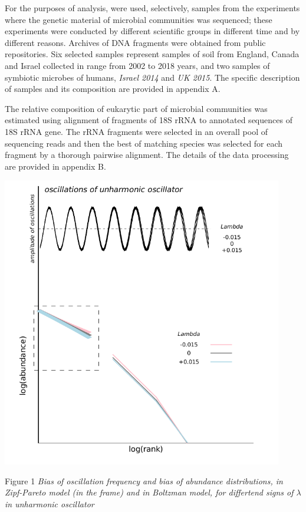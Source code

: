 \documentclass[a4paper]{article}
\begin{document}
For the purposes of analysis, were used, selectively, samples from the experiments where the genetic material of microbial communities was sequenced; these experiments were conducted by different scientific groups in different time and by different reasons. Archives of DNA fragments were obtained from public repositories. Six selected samples represent samples of soil from England, Canada and Israel collected in range from 2002 to 2018 years, and two samples of symbiotic microbes of humans, \textit{Israel 2014} and \textit{UK 2015}. The specific description of samples and its composition are provided in appendix A.

The relative composition of eukarytic part of microbial communities was estimated using alignment of fragments of 18S rRNA to annotated sequences of 18S rRNA gene. The rRNA fragments were selected in an overall pool of sequencing reads and then the best of matching species was selected for each fragment by a thorough pairwise alignment. The details of the data processing are provided in appendix B.


\includegraphics[width=0.92\textwidth]{rankabundance_unharmonic.jpg}

Figure 1 \textit{Bias of oscillation frequency and bias of abundance distributions, in Zipf-Pareto model (in the frame) and in Boltzman model, for differtend signs of $\lambda$ in unharmonic oscillator}
\end{document}
